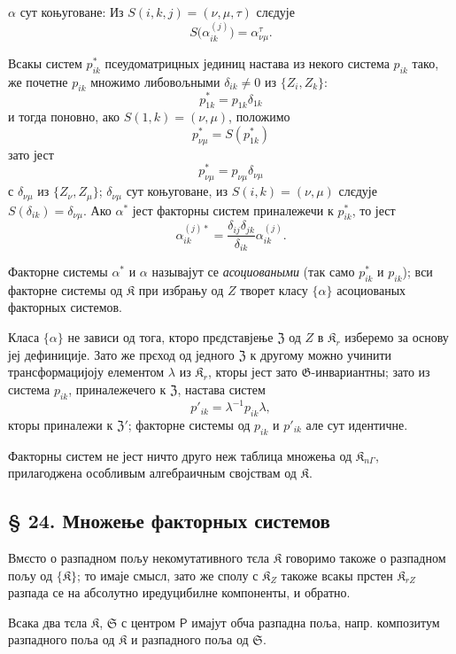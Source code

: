 \documentclass[11pt]{article}
\begin{document}
\(\alpha\) сут коњуговане: Из \(S(i,k,j)=(\nu,\mu,\tau)\) слєдује
\[
S\bigl(\alpha_{ik}^{(j)}\bigr)=\alpha_{\nu\mu}^{\tau}.
\]

Всакы систем \(p_{ik}^*\) псеудоматрицных јединиц настава из некого система \(p_{ik}\) тако, же почетне \(p_{ik}\) множимо либовољными \(\delta_{ik}\ne0\) из \(\{Z_i,Z_k\}\):
\[
p_{1k}^*=p_{1k}\delta_{1k}
\]
и тогда поновно, ако \(S(1,k)=(\nu,\mu)\), положимо
\[
p_{\nu\mu}^*=S(p_{1k}^*)
\]
зато јест
\[
p_{\nu\mu}^*=p_{\nu\mu}\delta_{\nu\mu}
\]
с \(\delta_{\nu\mu}\) из \(\{Z_\nu,Z_\mu\}\); \(\delta_{\nu\mu}\) сут коњуговане, из \(S(i,k)=(\nu,\mu)\) слєдује \(S(\delta_{ik})=\delta_{\nu\mu}\). Ако \(\alpha^*\) јест факторны систем приналежечи к \(p_{ik}^*\), то јест
\[
\alpha_{ik}^{(j)*}=\frac{\delta_{ij}\delta_{jk}}{\delta_{ik}}\alpha_{ik}^{(j)}.
\]

Факторне системы \(\alpha^*\) и \(\alpha\) называјут се \emph{асоциоваными} (так само \(p_{ik}^*\) и \(p_{ik}\)); вси факторне системы од \(\mathfrak K\) при избрању од \(Z\) творет класу \(\{\alpha\}\) асоциованых факторных системов.

Класа \(\{\alpha\}\) не зависи од тога, кторо прєдставјење \(\mathfrak Z\) од \(Z\) в \(\mathfrak K_r\) изберемо за основу јеј дефиниције. Зато же прєход од једного \(\mathfrak Z\) к другому можно учинити трансформацијоју елементом \(\lambda\) из \(\mathfrak K_r\), кторы јест зато \(\mathfrak G\)-инвариантны; зато из система \(p_{ik}\), приналежечего к \(\mathfrak Z\), настава систем
\[
p'_{ik}=\lambda^{-1}p_{ik}\lambda,
\]
кторы приналежи к \(\mathfrak Z'\); факторне системы од \(p_{ik}\) и \(p'_{ik}\) але сут идентичне.

Факторны систем не јест ничто друго неж таблица множења од \(\mathfrak K_{n\Gamma}\), прилагоджена особливым алгебраичным својствам од \(\mathfrak K\).

\subsection*{§ 24. Множење факторных системов}\label{multiplikation-von-faktorensystemen}

Вмєсто о разпадном пољу некомутативного тєла \(\mathfrak K\) говоримо такоже о разпадном пољу од \(\{\mathfrak K\}\); то имаје смысл, зато же сполу с \(\mathfrak K_Z\) такоже всакы прстен \(\mathfrak K_{rZ}\) разпада се на абсолутно иредуцибилне компоненты, и обратно.

Всака два тєла \(\mathfrak K\), \(\mathfrak S\) с центром \(\mathsf P\) имајут обча разпадна поља, напр. композитум разпадного поља од \(\mathfrak K\) и разпадного поља од \(\mathfrak S\).
\end{document}
